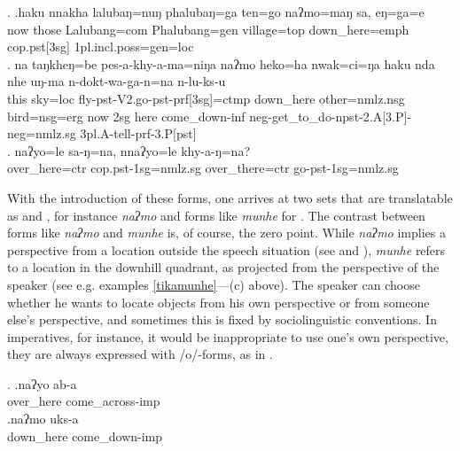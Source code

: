 \ex. \ag.haku nnakha lalubaŋ=nuŋ   phalubaŋ=ga    ten=go         naʔmo=maŋ      sa,     eŋ=ga=e\\
now those Lalubang{\sc =com} Phalubang{\sc =gen} village{\sc =top} down\_here{\sc =emph} {\sc cop.pst[3sg]} {\sc 1pl.incl.poss=gen=loc}\\
 
\bg. na   taŋkheŋ=be    pes-a-khy-a-ma=niŋa naʔmo heko=ha nwak=ci=ŋa haku nda nhe uŋ-ma n-dokt-wa-ga-n=na n-lu-ks-u\\
	this sky{\sc =loc} fly{\sc -pst-V2.go-pst-prf[3sg]=ctmp} down\_here other{\sc =nmlz.nsg} bird{\sc =nsg=erg}	now {\sc 2sg} here come\_down{\sc -inf} {\sc neg-}get\_to\_do{\sc -npst-2.A[3.P]-neg=nmlz.sg} 	{\sc 3pl.A}-tell-{\sc prf-3.P[pst]}\\
	 
\bg.	naʔyo=le             sa-ŋ=na,                 nnaʔyo=le             khy-a-ŋ=na?\\
over\_here{\sc =ctr} {\sc cop.pst-1sg=nmlz.sg} over\_there{\sc =ctr} go{\sc -pst-1sg=nmlz.sg}\\
 


With the introduction of these forms, one arrives at two sets that are translatable as  and , for instance \emph{naʔmo}  and forms like  \emph{munhe} for . The  contrast between forms like  \emph{naʔmo}  and  \emph{munhe} is, of course, the zero point. While \emph{naʔmo} implies a perspective from a location outside the speech situation (see \Last and \Next), \emph{munhe} refers to a location in the downhill quadrant, as projected from the perspective of the speaker (see e.g. examples \ref{tikamunhe}—(c) above).  The speaker can choose whether he wants to locate objects from his own perspective or from someone else's perspective, and sometimes this is fixed by sociolinguistic conventions. In imperatives, for instance, it would be inappropriate to use one's own perspective, they are always expressed with /o/-forms, as in \Next. 

\ex. \ag.naʔyo ab-a\\
over\_here come\_across{\sc -imp}\\
\bg.naʔmo uks-a\\
down\_here come\_down{\sc -imp}\\



